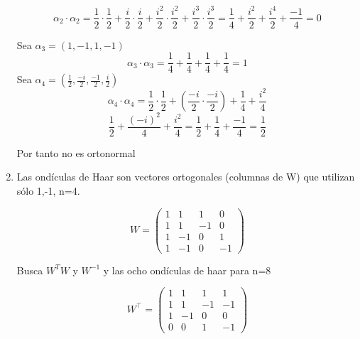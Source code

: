 \documentclass{report}
\begin{document}
\begin{enumerate}
    $$\alpha_2\cdot\alpha_2=\frac{1}{2}\cdot\frac{1}{2}+\frac{i}{2}\cdot\frac{i}{2}+\frac{i^2}{2}\cdot \frac{i^2}{2}+\frac{i^3}{2}\cdot\frac{i^3}{2}=\frac{1}{4}+\frac{i^2}{2}+\frac{i^4}{2}+\frac{-1}{4}=0$$
    
    Sea $\alpha_3=(1,-1,1,-1)$
    $$\alpha_3\cdot\alpha_3=\frac{1}{4}+\frac{1}{4}+\frac{1}{4}+\frac{1}{4}=1$$
    Sea $\alpha_4=(\frac{1}{2},\frac{-i}{2},\frac{-1}{2},\frac{i}{2})$
    $$\alpha_4\cdot\alpha_4=\frac{1}{2}\cdot\frac{1}{2}+\left(\frac{-i}{2}\cdot\frac{-i}{2}\right)+\frac{1}{4}+\frac{i^2}{4}$$
    $$\frac{1}{2}+\frac{(-i)^2}{4}+\frac{i^2}{4}=\frac{1}{2}+\frac{1}{4}+\frac{-1}{4}=\frac{1}{2}$$
    
    Por tanto no es ortonormal
    
    \item Las ondículas de Haar son vectores ortogonales (columnas de W) que utilizan sólo 1,-1, n=4.
    
    $$W=\begin{pmatrix}
        1 &1&1&0\\
        1 & 1 &-1 &0\\
        1 & -1 &0 &1\\
        1 & -1 &0 &-1
    \end{pmatrix}$$
    
    Busca $W^TW$ y $W^{-1}$ y las ocho ondículas de haar para n=8
    
    
    \[W^\top = \begin{pmatrix}
        1 & 1 & 1 & 1 \\
        1 & 1 & -1 & -1 \\
        1 & -1 & 0 & 0 \\
        0 & 0 & 1 & -1
    \end{pmatrix}\]
    

\end{enumerate}
\end{document}
